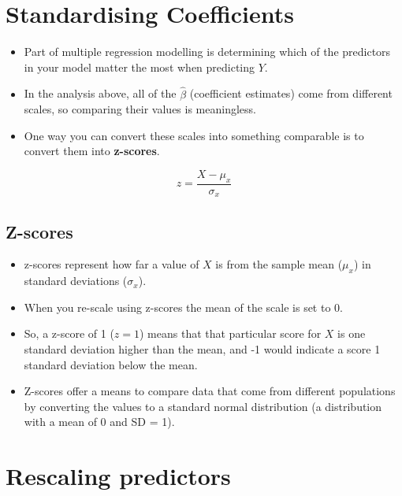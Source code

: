 \documentclass[
]{article}
\providecommand{\tightlist}{%
  \setlength{\itemsep}{0pt}\setlength{\parskip}{0pt}}
\begin{document}
\hypertarget{standardising-coefficients}{%
\section{Standardising Coefficients}\label{standardising-coefficients}}

\begin{itemize}
\tightlist
\item
  Part of multiple regression modelling is determining which of the
  predictors in your model matter the most when predicting \(Y\).
\item
  In the analysis above, all of the \(\hat{\beta}\) (coefficient
  estimates) come from different scales, so comparing their values is
  meaningless.
\item
  One way you can convert these scales into something comparable is to
  convert them into \textbf{z-scores}.
\end{itemize}

\[z = \frac{X - \mu_x}{\sigma_x}\]

\hypertarget{z-scores}{%
\subsection{Z-scores}\label{z-scores}}

\begin{itemize}
\tightlist
\item
  z-scores represent how far a value of \(X\) is from the sample mean
  (\(\mu_x\)) in standard deviations (\(\sigma_x\)).
\item
  When you re-scale using z-scores the mean of the scale is set to 0.
\item
  So, a z-score of 1 (\(z = 1\)) means that that particular score for
  \(X\) is one standard deviation higher than the mean, and -1 would
  indicate a score 1 standard deviation below the mean.
\item
  Z-scores offer a means to compare data that come from different
  populations by converting the values to a standard normal distribution
  (a distribution with a mean of 0 and SD = 1).
\end{itemize}

\hypertarget{rescaling-predictors}{%
\section{Rescaling predictors}\label{rescaling-predictors}}
\end{document}
